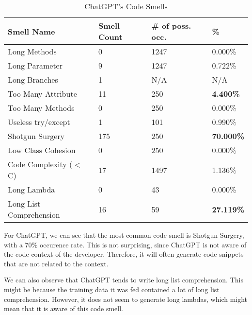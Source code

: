 \begin{table}[!ht]
    \centering
    \caption{ChatGPT's Code Smells}
    \begin{tabular}{llll}
        \hline
        \textbf{Smell Name}     & \textbf{Smell Count} & \textbf{\# of poss. occ.} & \textbf{\%}       \\ \hline
        Long Methods            & 0                    & 1247                      & 0.000\%           \\
        Long Parameter          & 9                    & 1247                      & 0.722\%           \\
        Long Branches           & 1                    & N/A                       & N/A               \\
        Too Many Attribute      & 11                   & 250                       & \textbf{4.400\%}  \\
        Too Many Methods        & 0                    & 250                       & 0.000\%           \\
        Useless try/except      & 1                    & 101                       & 0.990\%           \\
        Shotgun Surgery         & 175                  & 250                       & \textbf{70.000\%} \\
        Low Class Cohesion      & 0                    & 250                       & 0.000\%           \\
        Code Complexity ($<$ C) & 17                   & 1497                      & 1.136\%           \\
        Long Lambda             & 0                    & 43                        & 0.000\%           \\
        Long List Comprehension & 16                   & 59                        & \textbf{27.119\%} \\ \hline
    \end{tabular}
    \label{table:result-chatgpt}
\end{table}
\FloatBarrier

For ChatGPT, we can see that the most common code smell is Shotgun Surgery, with a 70\% occurence rate. This is not surprising, since ChatGPT is not aware of the code context of the developer. Therefore, it will often generate code snippets that are not related to the context.

We can also observe that ChatGPT tends to write long list comprehension. This might be because the training data it was fed contained a lot of long list comprehension. However, it does not seem to generate long lambdas, which might mean that it is aware of this code smell.

